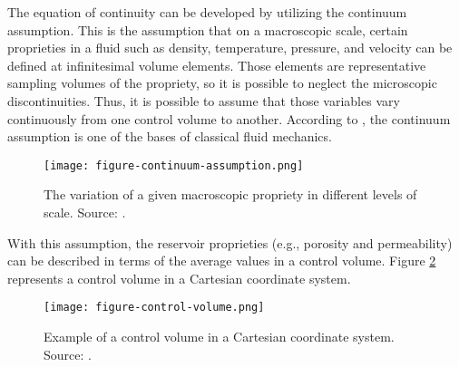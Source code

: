 The equation of continuity can be developed by utilizing the continuum assumption.
%
This is the assumption that on a macroscopic scale, certain proprieties in a fluid such as density, temperature, pressure, and velocity can be defined at infinitesimal volume elements.
%
Those elements are representative sampling volumes of the propriety, so it is possible to neglect the microscopic discontinuities.
%
Thus, it is possible to assume that those variables vary continuously from one control volume to another.
%
According to \cite{Fox2008}, the continuum assumption is one of the bases of classical fluid mechanics.
%
\begin{figure}[H]
	\centering
	\texttt{[image: figure-continuum-assumption.png]}
	\caption{The variation of a given macroscopic propriety in different levels of scale. Source: \cite{Kandlikar2014}.}
	\label{figure-continuum-assumption}
\end{figure}
\noindent
%
With this assumption, the reservoir proprieties (e.g., porosity and permeability) can be described in terms of the average values in a control volume.
%
Figure \ref{figure-control-volume} represents a control volume in a Cartesian coordinate system.
%
	\begin{figure}[H]
	\centering
	\texttt{[image: figure-control-volume.png]}\\
	\caption{Example of a control volume in a Cartesian coordinate system. Source: \cite{Ertekin2001}.}
	\label{figure-control-volume}
	\end{figure}

